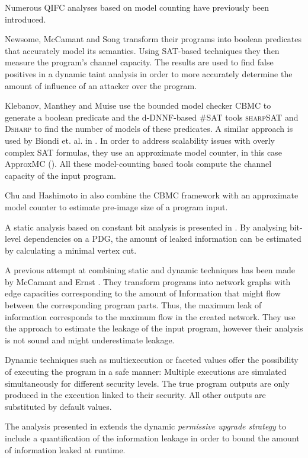 Numerous QIFC analyses based on model counting have previously been introduced.

Newsome, McCamant and Song \cite{newsome09} transform their programs into boolean predicates that accurately model its semantics. Using SAT-based techniques they then measure the program's channel capacity. The results are used to find false positives in a dynamic taint analysis in order to more accurately determine the amount of influence of an attacker over the program. 

Klebanov, Manthey and Muise \cite{klebanov13} use the bounded model checker CBMC \cite{cbmc} to generate a boolean predicate and the d-DNNF-based \#SAT tools \textsc{sharp}SAT \cite{thurley06} and \textsc{Dsharp} \cite{muise12} to find the number of models of these predicates. A similar approach is used by Biondi et. al. in \cite{biondi18}. In order to address scalability issues with overly complex SAT formulas, they use an approximate model counter, in this case ApproxMC (\cite{chakraborty13}). All these model-counting based tools compute the channel capacity of the input program.

Chu and Hashimoto in \cite{chu19} also combine the CBMC framework with an approximate model counter to estimate pre-image size of a program input.

A static analysis based on constant bit analysis is presented in \cite{bechberger18}. By analysing bit-level dependencies on a PDG, the amount of leaked information can be estimated by calculating a minimal vertex cut.

A previous attempt at combining static and dynamic techniques has been made by McCamant and Ernst \cite{mccamant08}. They transform programs into network graphs with edge capacities corresponding to the amount of Information that might flow between the corresponding program parts. Thus, the maximum leak of information corresponds to the maximum flow in the created network. They use the approach to estimate the leakage of the input program, however their analysis is not sound and might underestimate leakage.

Dynamic techniques such as multiexecution \cite{devriese10} or faceted values \cite{austin17} offer the possibility of executing the program in a safe manner: Multiple executions are simulated simultaneously for different security levels. The true program outputs are only produced in the execution linked to their security. All other outputs are substituted by default values.

The analysis presented in \cite{bichhawat17} extends the dynamic \emph{permissive upgrade strategy} to include a quantification of the information leakage in order to bound the amount of information leaked at runtime.

